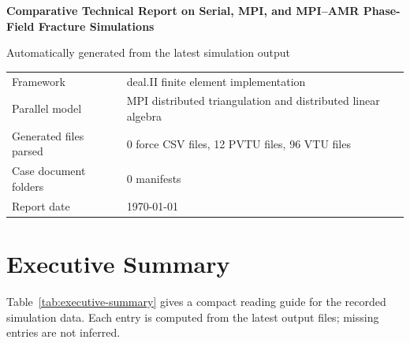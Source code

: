 \documentclass[11pt,a4paper]{report}
\begin{document}
\begin{titlepage}
\centering
\vspace*{1.2cm}
{\Large\bfseries Comparative Technical Report on Serial, MPI, and MPI--AMR Phase-Field Fracture Simulations\par}
\vspace{1.0cm}
{\large Automatically generated from the latest simulation output\par}
\vfill
\begin{tabular}{ll}
Framework & deal.II finite element implementation\\
Parallel model & MPI distributed triangulation and distributed linear algebra\\
Generated files parsed & 0 force CSV files, 12 PVTU files, 96 VTU files\\
Case document folders & 0 manifests\\
Report date & \today
\end{tabular}
\vfill
\end{titlepage}

\begin{abstract}
This report is generated automatically after the simulation driver completes. It extracts only real data available in the latest output files. The current archive contains 1 usable force--displacement series and the largest recorded force is 0.403725. Required datasets that are absent are marked explicitly as ``Not recorded in the current simulation output''.
\end{abstract}

\tableofcontents
\listoffigures
\listoftables

\chapter{Executive Summary}
Table~\ref{tab:executive-summary} gives a compact reading guide for the recorded simulation data. Each entry is computed from the latest output files; missing entries are not inferred.
\end{document}
